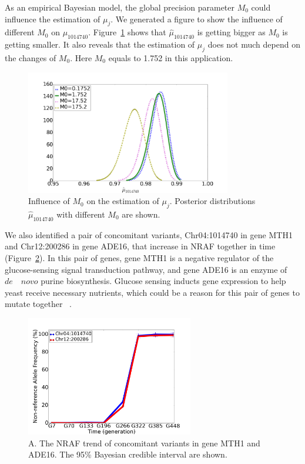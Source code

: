 \documentclass[11pt,reqno]{amsart}
\begin{document}
As an empirical Bayesian model, the global precision parameter $M_0$ could influence the estimation of $\mu_j$.
We generated a figure to show the influence of different $M_0$ on $\mu_{1014740}$.
Figure~\ref{tbl:M0} shows that $\hat{\mu}_{1014740}$ is getting bigger as $M_0$ is getting smaller.
It also reveals that the estimation of $\mu_j$ does not much depend on the changes of $M_0$.
Here $M_0$ equals to 1.752 in this application.
\begin{figure}[htbp]
\centering
\includegraphics[width=0.8\textwidth]{figs/diff_M0.png}
\caption{Influence of $M_0$ on the estimation of $\mu_j$.
Posterior distributions $\hat{\mu}_{1014740}$ with different $M_0$ are shown.}
\label{tbl:M0}
\end{figure}

We also identified a pair of concomitant variants, Chr04:1014740 in gene MTH1 and Chr12:200286 in gene ADE16, that increase in NRAF together in time (Figure~\ref{tbl:concomitant}).
In this pair of genes, gene MTH1 is a negative regulator of the glucose-sensing signal transduction pathway, and gene ADE16 is an enzyme of $\mathit{de \quad  novo}$ purine biosynthesis.
Glucose sensing inducts gene expression to help yeast receive necessary nutrients, which could be a reason for this pair of genes to mutate together ~\citep{johnston1999feasting}.
\begin{figure}[htbp]
\centering
\includegraphics[width=0.65\textwidth]{figs/concomitant.png}
\caption{A. The NRAF trend of concomitant variants in gene MTH1 and ADE16.
The 95\% Bayesian credible interval are shown.}
\label{tbl:concomitant}
\end{figure}
\end{document}
